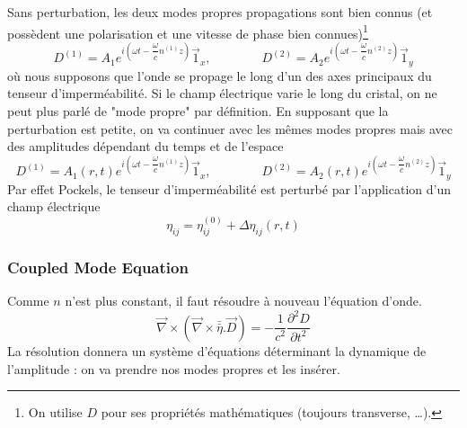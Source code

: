 Sans perturbation, les deux modes propres propagations sont bien connus (et possèdent une polarisation
et une vitesse de phase bien connues)\footnote{On utilise $D$ pour ses propriétés mathématiques (toujours
transverse, \dots).}
\begin{equation}
D^{(1)} = A_1e^{i\left(\omega t -\dfrac{\omega}{c}n^{(1)}z\right)}\vec{1}_x,\qquad\qquad
D^{(2)} = A_2e^{i\left(\omega t -\dfrac{\omega}{c}n^{(2)}z\right)}\vec{1}_y
\end{equation}
où nous supposons que l'onde se propage le long d'un des axes principaux du tenseur d'imperméabilité. 
Si le champ électrique varie le long du cristal, on ne peut plus parlé de "mode propre" par définition.
En supposant que la perturbation est petite, on va continuer avec les mêmes modes propres mais avec 
des amplitudes dépendant du temps et de l'espace
\begin{equation}
D^{(1)} = A_1(r,t)e^{i\left(\omega t -\dfrac{\omega}{c}n^{(1)}z\right)}\vec{1}_x,\qquad\qquad
D^{(2)} = A_2(r,t)e^{i\left(\omega t -\dfrac{\omega}{c}n^{(2)}z\right)}\vec{1}_y
\end{equation}
Par effet Pockels, le tenseur d'imperméabilité est perturbé par l'application d'un champ électrique
\begin{equation}
\eta_{ij} = \eta_{ij}^{(0)}+\Delta \eta_{ij}(r,t)
\end{equation}


\subsubsection{Coupled Mode Equation}
Comme $n$ n'est plus constant, il faut résoudre à nouveau l'équation d'onde. 
\begin{equation}
\vec \nabla\times(\vec\nabla\times\bar{\bar{\eta}}.\vec{D}) = -\dfrac{1}{c^2}\dfrac{\partial^2D}{\partial t^2}
\end{equation}
La résolution donnera un système d'équations déterminant la dynamique de l'amplitude : on va prendre
nos modes propres et les insérer. \\

